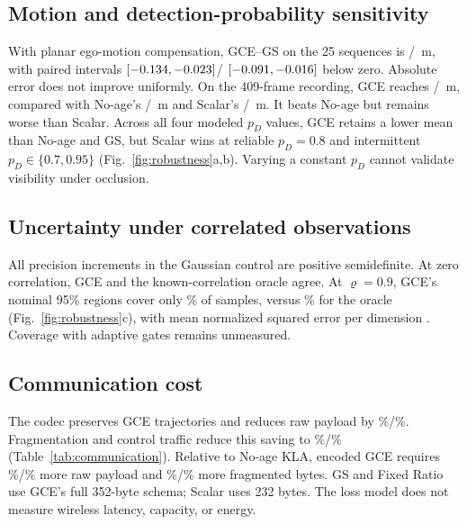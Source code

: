\subsection{Motion and detection-probability sensitivity}
With planar ego-motion compensation, GCE--GS on the 25 sequences is
\RevMotionSeenDeltaGSReliableMean/\RevMotionSeenDeltaGSIntermittentMean\ m,
with paired intervals
$[-0.134,-0.023]$/
$[-0.091,-0.016]$
below zero. Absolute error does not improve uniformly. On the 409-frame
recording, GCE reaches
\RevMotionNewRecordingGCEReliable/\RevMotionNewRecordingGCEIntermittent\ m,
compared with No-age's
\RevMotionNewRecordingNoAgeReliable/\RevMotionNewRecordingNoAgeIntermittent\ m
and Scalar's
\RevMotionNewRecordingScalarReliable/\RevMotionNewRecordingScalarIntermittent\ m.
It beats No-age but remains worse than Scalar.
Across all four modeled $p_D$ values, GCE retains a lower mean than
No-age and GS, but Scalar wins at reliable $p_D=0.8$ and intermittent
$p_D\in\{0.7,0.95\}$ (Fig.~\ref{fig:robustness}a,b).
Varying a constant $p_D$ cannot validate visibility under occlusion.

\subsection{Uncertainty under correlated observations}
All precision increments in the Gaussian control are positive semidefinite.
At zero correlation, GCE and the known-correlation oracle agree.
At $\varrho=0.9$, GCE's nominal
95\% regions cover only \RevCorrelationGCECoverage\% of samples, versus
\RevCorrelationOracleCoverage\% for the oracle
(Fig.~\ref{fig:robustness}c), with mean normalized squared error per
dimension \RevCorrelationGCENEES. Coverage with adaptive gates remains
unmeasured.

\subsection{Communication cost}
The codec preserves GCE trajectories and reduces raw payload by
\CodecRawSavingReliable\%/\CodecRawSavingIntermittent\%.
Fragmentation and control traffic reduce this saving to
\CodecWireSavingReliable\%/\CodecWireSavingIntermittent\%
(Table~\ref{tab:communication}). Relative to No-age KLA, encoded GCE requires
\CodecRawExtraNoAgeReliable\%/\CodecRawExtraNoAgeIntermittent\% more raw
payload and
\CodecWireExtraNoAgeReliable\%/\CodecWireExtraNoAgeIntermittent\% more
fragmented bytes. GS and Fixed Ratio use GCE's full 352-byte schema;
Scalar uses 232 bytes. The loss model does not measure wireless latency,
capacity, or energy.
